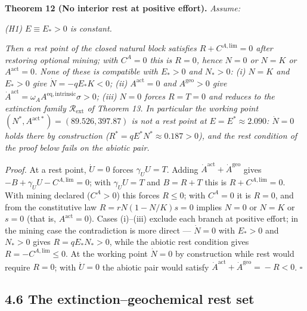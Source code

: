 \documentclass[11pt]{article}
\begin{document}
\textbf{Theorem 12 (No interior rest at positive effort).} \emph{Assume:}

\emph{(H1) \(E \equiv E_* > 0\) is constant.}

\emph{Then a rest point of the closed natural block satisfies \(R + C^{A,\mathrm{lim}} = 0\) after restoring optional mining; with \(C^A = 0\) this is \(R = 0\), hence \(N = 0\) or \(N = K\) or \(A^{\mathrm{act}} = 0\). None of these is compatible with \(E_* > 0\) and \(N_* > 0\): (i) \(N = K\) and \(E_* > 0\) give \(\dot N = -qE_* K < 0\); (ii) \(A^{\mathrm{act}} = 0\) and \(A^{\mathrm{geo}} > 0\) give \(\dot A^{\mathrm{act}} =\allowbreak{} \omega_A A^{\mathrm{eq,\allowbreak{}intrinsic}} \sigma > 0\); (iii) \(N = 0\) forces \(R = T = 0\) and reduces to the extinction family \(\mathcal{R}_{\mathrm{ext}}\) of Theorem 13. In particular the working point \((N^*,\allowbreak{} A^{\mathrm{act}*}) =\allowbreak{} (89.526,\allowbreak{} 397.87)\) is not a rest point at \(E = E^* \approx 2.090\): \(\dot N = 0\) holds there by construction (\(R^* =\allowbreak{} qE^*N^* \approx 0.187 > 0\)), and the rest condition of the proof below fails on the abiotic pair.}

\emph{Proof.} At a rest point, \(\dot U = 0\) forces \(\gamma_U U = T\). Adding \(\dot A^{\mathrm{act}} +\allowbreak{} \dot A^{\mathrm{geo}}\) gives \(-B +\allowbreak{} \gamma_U U - C^{A,\allowbreak{}\mathrm{lim}} =\allowbreak{} 0\); with \(\gamma_U U = T\) and \(B = R + T\) this is \(R + C^{A,\mathrm{lim}} = 0\). With mining declared (\(C^A > 0\)) this forces \(R \le 0\); with \(C^A = 0\) it is \(R = 0\), and from the constitutive law \(R =\allowbreak{} rN(1 - N/\allowbreak{}K)s =\allowbreak{} 0\) implies \(N = 0\) or \(N = K\) or \(s = 0\) (that is, \(A^{\mathrm{act}} = 0\)). Cases (i)--(iii) exclude each branch at positive effort; in the mining case the contradiction is more direct --- \(\dot N = 0\) with \(E_* > 0\) and \(N_* > 0\) gives \(R = qE_*N_* > 0\), while the abiotic rest condition gives \(R = -C^{A,\mathrm{lim}} \le 0\). At the working point \(\dot N = 0\) by construction while rest would require \(R = 0\); with \(\dot U = 0\) the abiotic pair would satisfy \(\dot A^{\mathrm{act}} +\allowbreak{} \dot A^{\mathrm{geo}} =\allowbreak{} -R < 0\). \(\square\)

\subsection*{4.6 The extinction--geochemical rest set}\label{46-the-extinction--geochemical-rest-set}
\end{document}
